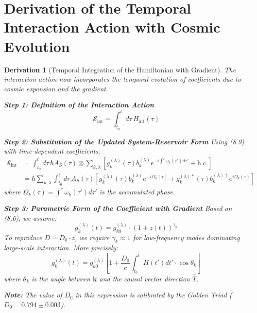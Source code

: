 \documentclass[10pt, a4paper]{article}
\newtheorem{derivation}{Derivation}
\begin{document}
\section{Derivation of the Temporal Interaction Action with Cosmic Evolution}

\begin{derivation}[Temporal Integration of the Hamiltonian with Gradient]
The interaction action now incorporates the temporal evolution of coefficients due to cosmic expansion and the gradient.

\textbf{Step 1: Definition of the Interaction Action}
\begin{equation}
\mathcal{S}_{\text{int}} = \int_{t_0}^{t} d\tau \, H_{\text{int}}(\tau)
\tag{10.1}
\end{equation}

\textbf{Step 2: Substitution of the Updated System-Reservoir Form}
Using (8.9) with time-dependent coefficients:
\begin{align}
\mathcal{S}_{\text{int}} &= \int_{t_0}^{t} d\tau \, \hbar A_S(\tau) \otimes \sum_{k,\lambda} \left[ g_{k}^{(\lambda)}(\tau) b_{k}^{(\lambda)} e^{-i\int^{\tau} \omega_k(\tau') d\tau'} + \text{h.c.} \right]
\tag{10.2} \\
&= \hbar \sum_{k,\lambda} \int_{t_0}^{t} d\tau \, A_S(\tau) \left[ g_{k}^{(\lambda)}(\tau) b_{k}^{(\lambda)} e^{-i\Omega_k(\tau)} + g_{k}^{(\lambda)*}(\tau) b_{k}^{(\lambda)\dagger} e^{i\Omega_k(\tau)} \right]
\tag{10.3}
\end{align}
where $\Omega_k(\tau) = \int^{\tau} \omega_k(\tau') d\tau'$ is the accumulated phase.

\textbf{Step 3: Parametric Form of the Coefficient with Gradient}
Based on (8.6), we assume:
\begin{equation}
g_{k}^{(\lambda)}(t) = g_{k0}^{(\lambda)} \cdot (1 + z(t))^{\gamma_k}
\tag{10.4}
\end{equation}
To reproduce $D = D_0 \cdot z$, we require $\gamma_k \approx 1$ for low-frequency modes dominating large-scale interaction. More precisely:
\begin{equation}
g_{k}^{(\lambda)}(t) = g_{k0}^{(\lambda)} \left[ 1 + \frac{D_0}{c} \int_{t_0}^{t} H(t') dt' \cdot \cos\theta_k \right]
\tag{10.5}
\end{equation}
where $\theta_k$ is the angle between $\mathbf{k}$ and the causal vector direction $\hat{T}$.

\textbf{Note:} The value of $D_0$ in this expression is calibrated by the Golden Triad ($D_0 = 0.794 \pm 0.003$).


\end{derivation}
\end{document}
